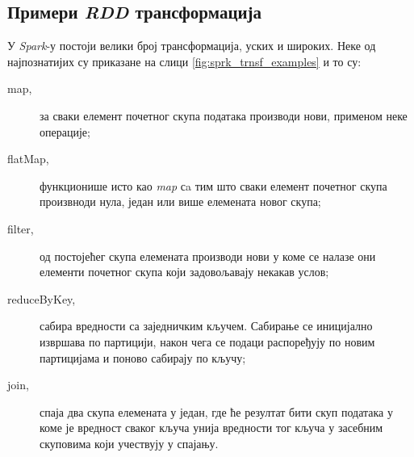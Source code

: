 \documentclass[12pt,oneside]{memoir}
\begin{document}



\subsection{Примери \textit{RDD} трансформација}
\label{subsec:spark_transformation_types}

У \textit{Spark}-у постоји велики број трансформација, уских и широких. Неке од најпознатијих су приказане на слици \ref{fig:sprk_trnsf_examples} и то су:

\begin{description}
	\item[map,] за сваки елемент почетног скупа података производи нови, применом неке операције;
	\item[flatMap,] функционише исто као \textit{map} сa тим што сваки елемент почетног скупа произвноди нула, један или више елемената новог скупа;
	\item[filter,] од постојећег скупа елемената производи нови у коме се налазе они елементи почетног скупа који задовољавају некакав услов;
	\item[reduceByKey,] сабира вредности са заједничким кључем. Сабирање се иницијално извршава по партицији, након чега се подаци распоређују по новим партицијама и поново сабирају по кључу;
	\item[join,] спаја два скупа елемената у један, где ће резултат бити скуп података у коме је вредност сваког кључа унија вредности тог кључа у засебним скуповима који учествују у спајању.
\end{description}
\end{document}
